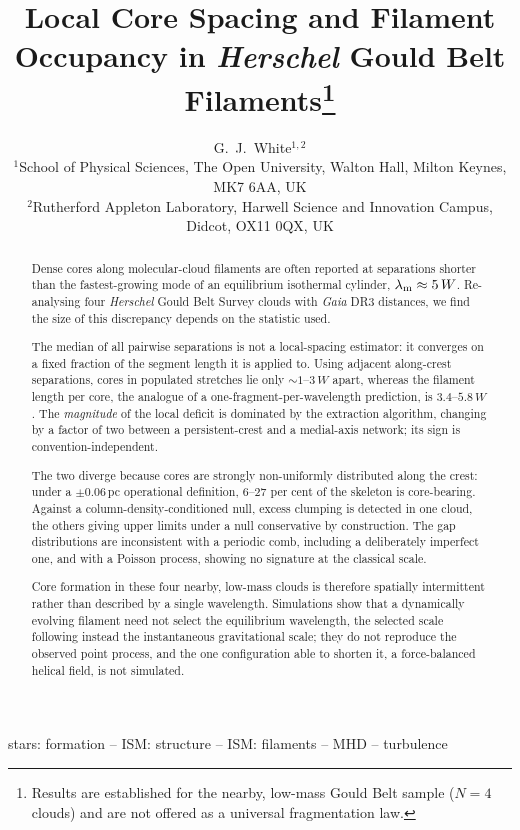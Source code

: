 \documentclass[usenatbib,twoside,twocolumn]{mnras}
\title[Core spacing and filament occupancy in HGBS filaments]{Local Core Spacing and Filament Occupancy in \textit{Herschel} Gould Belt Filaments\thanks{Results are established for the nearby, low-mass Gould Belt sample ($N=4$ clouds) and are not offered as a universal fragmentation law.}}
\author[G.~J.~White]{G.~J.~White$^{1,2}$\\
$^{1}$School of Physical Sciences, The Open University, Walton Hall, Milton Keynes, MK7 6AA, UK\\
$^{2}$Rutherford Appleton Laboratory, Harwell Science and Innovation Campus, Didcot, OX11 0QX, UK}
\begin{document}
\maketitle

\begin{abstract}
Dense cores along molecular-cloud filaments are often reported at separations shorter than the fastest-growing mode of an equilibrium isothermal cylinder, $\lambda_{\rm m}\approx5\,W$. Re-analysing four \textit{Herschel} Gould Belt Survey clouds with \textit{Gaia} DR3 distances, we find the size of this discrepancy depends on the statistic used.

The median of all pairwise separations is not a local-spacing estimator: it converges on a fixed fraction of the segment length it is applied to. Using adjacent along-crest separations, cores in populated stretches lie only $\sim1$--$3\,W$ apart, whereas the filament length per core, the analogue of a one-fragment-per-wavelength prediction, is $3.4$--$5.8\,W$. The \emph{magnitude} of the local deficit is dominated by the extraction algorithm, changing by a factor of two between a persistent-crest and a medial-axis network; its sign is convention-independent.

The two diverge because cores are strongly non-uniformly distributed along the crest: under a $\pm0.06$\,pc operational definition, $6$--$27$ per cent of the skeleton is core-bearing. Against a column-density-conditioned null, excess clumping is detected in one cloud, the others giving upper limits under a null conservative by construction. The gap distributions are inconsistent with a periodic comb, including a deliberately imperfect one, and with a Poisson process, showing no signature at the classical scale.

Core formation in these four nearby, low-mass clouds is therefore spatially intermittent rather than described by a single wavelength. Simulations show that a dynamically evolving filament need not select the equilibrium wavelength, the selected scale following instead the instantaneous gravitational scale; they do not reproduce the observed point process, and the one configuration able to shorten it, a force-balanced helical field, is not simulated.
\end{abstract}

\begin{keywords}
stars: formation -- ISM: structure -- ISM: filaments -- MHD -- turbulence
\end{keywords}
\end{document}
